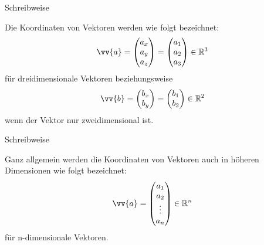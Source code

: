 \begin{frame}{Schreibweise}
	\begin{bemerkung}[Koordinaten]
		Die Koordinaten von Vektoren werden wie folgt bezeichnet:
		\[
			\vv{a} = \begin{pmatrix}
			a_x \\ a_y \\ a_z
				\end{pmatrix} = \begin{pmatrix}
				a_1 \\ a_2 \\ a_3
				\end{pmatrix} \in \mathbb{R}^3
		\]
		für dreidimensionale Vektoren beziehungsweise
				\[
				\vv{b} = \begin{pmatrix}
				b_x \\ b_y
				\end{pmatrix} = \begin{pmatrix}
				b_1 \\ b_2
				\end{pmatrix} \in \mathbb{R}^2
				\]
		wenn der Vektor nur zweidimensional ist.
				
	\end{bemerkung}
\end{frame}

\begin{frame}{Schreibweise}
	\begin{bemerkung}[Koordinaten]
		Ganz allgemein werden die Koordinaten von Vektoren auch in höheren Dimensionen wie folgt bezeichnet:
		\[
		\vv{a} = \begin{pmatrix}
		a_1 \\ a_2 \\ \vdots \\ a_n
		\end{pmatrix} \in \mathbb{R}^{n}
		\]
		für n-dimensionale Vektoren.
	\end{bemerkung}
\end{frame}


